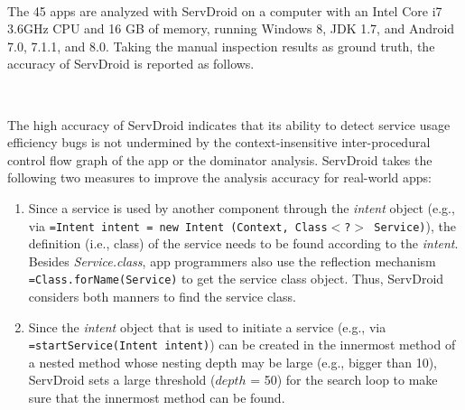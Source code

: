 \documentclass[conference]{IEEEtran}
\newcommand{\hytt}[1]{\texttt{\hyphenchar\font=\defaulthyphenchar #1}}
\begin{document}
\medskip
{\setlength{\parindent}{0 em}
}\\
\medskip

The 45 apps are analyzed with \textsf{ServDroid} on a computer with an Intel Core i7 3.6GHz CPU and 16 GB of memory, running Windows 8, JDK 1.7, and Android 7.0, 7.1.1, and 8.0. Taking the manual inspection results as ground truth, the accuracy of \textsf{ServDroid} is reported as follows.

\medskip
{\setlength{\parindent}{0 em}
}\\
\medskip

The high accuracy of \textsf{ServDroid} indicates that its ability to detect service usage efficiency bugs is not undermined by the context-insensitive inter-procedural control flow graph of the app or the dominator analysis. \textsf{ServDroid} takes the following two measures to improve the analysis accuracy for real-world apps:
\begin{enumerate}
\item Since a service is used by another component through the \textit{intent} object (e.g., via \hytt{Intent intent = new Intent (Context, Class$<$?$>$ Service)}), the definition (i.e., class) of the service needs to be found according to the \textit{intent}. Besides \textit{Service.class}, app programmers also use the reflection mechanism \hytt{Class.forName(Service)} to get the service class object. Thus, \textsf{ServDroid} considers both manners to find the service class.
\item Since the \textit{intent} object that is used to initiate a service (e.g., via \hytt{startService(Intent intent)}) can be created in the innermost method of a nested method whose nesting depth may be large (e.g., bigger than 10), \textsf{ServDroid} sets a large threshold ($depth$ = 50) for the search loop to make sure that the innermost method can be found.
\end{enumerate}
\end{document}
